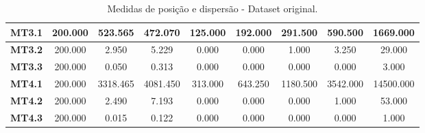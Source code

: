\documentclass[
	article,			%
	11pt,				%
	oneside,			%
	a4paper,			%
	english,			%
	brazil,				%
	sumario=tradicional
	]{abntex2}
\begin{document}
\begin{table}[H]
\begin{tabular}{l|c|c|c|c|c|c|c|c|}
\multicolumn{1}{|l|}{\textbf{MT3.1}}  & 200.000 & 523.565  & 472.070  & 125.000 & 192.000 & 291.500  & 590.500  & 1669.000  \\ \hline
\multicolumn{1}{|l|}{\textbf{MT3.2}}  & 200.000 & 2.950    & 5.229    & 0.000   & 0.000   & 1.000    & 3.250    & 29.000    \\ \hline
\multicolumn{1}{|l|}{\textbf{MT3.3}}  & 200.000 & 0.050    & 0.313    & 0.000   & 0.000   & 0.000    & 0.000    & 3.000     \\ \hline
\multicolumn{1}{|l|}{\textbf{MT4.1}}  & 200.000 & 3318.465 & 4081.450 & 313.000 & 643.250 & 1180.500 & 3542.000 & 14500.000 \\ \hline
\multicolumn{1}{|l|}{\textbf{MT4.2}}  & 200.000 & 2.490    & 7.193    & 0.000   & 0.000   & 0.000    & 1.000    & 53.000    \\ \hline
\multicolumn{1}{|l|}{\textbf{MT4.3}}  & 200.000 & 0.015    & 0.122    & 0.000   & 0.000   & 0.000    & 0.000    & 1.000     \\ \hline
\end{tabular}
\caption{Medidas de posição e dispersão - Dataset original.}
\label{tab:est_ori}
\end{table}
\end{document}
